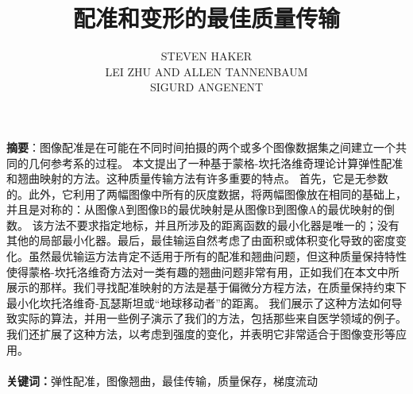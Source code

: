 \title{配准和变形的最佳质量传输}
\author{STEVEN HAKER \\ LEI ZHU AND ALLEN TANNENBAUM \\ SIGURD ANGENENT}
\date{\empty} 
\maketitle

\thispagestyle{empty}

\noindent
\textbf{摘要}：图像配准是在可能在不同时间拍摄的两个或多个图像数据集之间建立一个共同的几何参考系的过程。
本文提出了一种基于蒙格-坎托洛维奇理论计算弹性配准和翘曲映射的方法。这种质量传输方法有许多重要的特点。
首先，它是无参数的。此外，它利用了两幅图像中所有的灰度数据，将两幅图像放在相同的基础上，并且是对称的：从图像A到图像B的最优映射是从图像B到图像A的最优映射的倒数。
该方法不要求指定地标，并且所涉及的距离函数的最小化器是唯一的；没有其他的局部最小化器。最后，最佳输运自然考虑了由面积或体积变化导致的密度变化。虽然最优输运方法肯定不适用于所有的配准和翘曲问题，但这种质量保持特性使得蒙格-坎托洛维奇方法对一类有趣的翘曲问题非常有用，正如我们在本文中所展示的那样。我们寻找配准映射的方法是基于偏微分方程方法，在质量保持约束下最小化坎托洛维奇-瓦瑟斯坦或“地球移动者”的距离。
我们展示了这种方法如何导致实际的算法，并用一些例子演示了我们的方法，包括那些来自医学领域的例子。我们还扩展了这种方法，以考虑到强度的变化，并表明它非常适合于图像变形等应用。
\\
\\
\noindent
\textbf{关键词：}弹性配准，图像翘曲，最佳传输，质量保存，梯度流动
